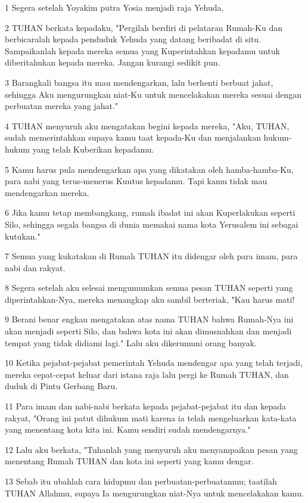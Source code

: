 \par 1 Segera setelah Yoyakim putra Yosia menjadi raja Yehuda,
\par 2 TUHAN berkata kepadaku, "Pergilah berdiri di pelataran Rumah-Ku dan berbicaralah kepada penduduk Yehuda yang datang beribadat di situ. Sampaikanlah kepada mereka semua yang Kuperintahkan kepadamu untuk diberitahukan kepada mereka. Jangan kurangi sedikit pun.
\par 3 Barangkali bangsa itu mau mendengarkan, lalu berhenti berbuat jahat, sehingga Aku mengurungkan niat-Ku untuk mencelakakan mereka sesuai dengan perbuatan mereka yang jahat."
\par 4 TUHAN menyuruh aku mengatakan begini kepada mereka, "Aku, TUHAN, sudah memerintahkan supaya kamu taat kepada-Ku dan menjalankan hukum-hukum yang telah Kuberikan kepadamu.
\par 5 Kamu harus pula mendengarkan apa yang dikatakan oleh hamba-hamba-Ku, para nabi yang terus-menerus Kuutus kepadamu. Tapi kamu tidak mau mendengarkan mereka.
\par 6 Jika kamu tetap membangkang, rumah ibadat ini akan Kuperlakukan seperti Silo, sehingga segala bangsa di dunia memakai nama kota Yerusalem ini sebagai kutukan."
\par 7 Semua yang kukatakan di Rumah TUHAN itu didengar oleh para imam, para nabi dan rakyat.
\par 8 Segera setelah aku selesai mengumumkan semua pesan TUHAN seperti yang diperintahkan-Nya, mereka menangkap aku sambil berteriak, "Kau harus mati!
\par 9 Berani benar engkau mengatakan atas nama TUHAN bahwa Rumah-Nya ini akan menjadi seperti Silo, dan bahwa kota ini akan dimusnahkan dan menjadi tempat yang tidak didiami lagi." Lalu aku dikerumuni orang banyak.
\par 10 Ketika pejabat-pejabat pemerintah Yehuda mendengar apa yang telah terjadi, mereka cepat-cepat keluar dari istana raja lalu pergi ke Rumah TUHAN, dan duduk di Pintu Gerbang Baru.
\par 11 Para imam dan nabi-nabi berkata kepada pejabat-pejabat itu dan kepada rakyat, "Orang ini patut dihukum mati karena ia telah mengeluarkan kata-kata yang menentang kota kita ini. Kamu sendiri sudah mendengarnya."
\par 12 Lalu aku berkata, "Tuhanlah yang menyuruh aku menyampaikan pesan yang menentang Rumah TUHAN dan kota ini seperti yang kamu dengar.
\par 13 Sebab itu ubahlah cara hidupmu dan perbuatan-perbuatanmu; taatilah TUHAN Allahmu, supaya Ia mengurungkan niat-Nya untuk mencelakakan kamu.

